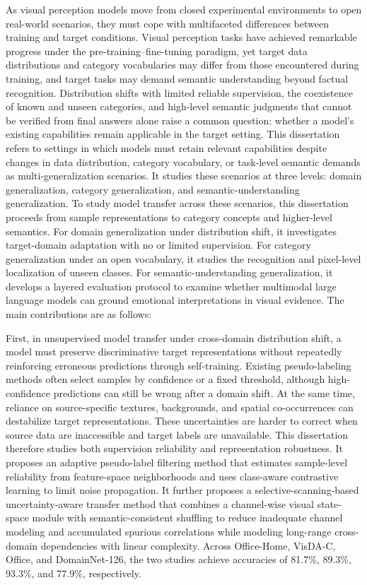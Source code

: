 \begin{eabstract}

As visual perception models move from closed experimental environments to open real-world scenarios, they must cope with multifaceted differences between training and target conditions. Visual perception tasks have achieved remarkable progress under the pre-training--fine-tuning paradigm, yet target data distributions and category vocabularies may differ from those encountered during training, and target tasks may demand semantic understanding beyond factual recognition. Distribution shifts with limited reliable supervision, the coexistence of known and unseen categories, and high-level semantic judgments that cannot be verified from final answers alone raise a common question: whether a model's existing capabilities remain applicable in the target setting. This dissertation refers to settings in which models must retain relevant capabilities despite changes in data distribution, category vocabulary, or task-level semantic demands as multi-generalization scenarios. It studies these scenarios at three levels: domain generalization, category generalization, and semantic-understanding generalization. To study model transfer across these scenarios, this dissertation proceeds from sample representations to category concepts and higher-level semantics. For domain generalization under distribution shift, it investigates target-domain adaptation with no or limited supervision. For category generalization under an open vocabulary, it studies the recognition and pixel-level localization of unseen classes. For semantic-understanding generalization, it develops a layered evaluation protocol to examine whether multimodal large language models can ground emotional interpretations in visual evidence. The main contributions are as follows:
  
First, in unsupervised model transfer under cross-domain distribution shift, a model must preserve discriminative target representations without repeatedly reinforcing erroneous predictions through self-training. Existing pseudo-labeling methods often select samples by confidence or a fixed threshold, although high-confidence predictions can still be wrong after a domain shift. At the same time, reliance on source-specific textures, backgrounds, and spatial co-occurrences can destabilize target representations. These uncertainties are harder to correct when source data are inaccessible and target labels are unavailable. This dissertation therefore studies both supervision reliability and representation robustness. It proposes an adaptive pseudo-label filtering method that estimates sample-level reliability from feature-space neighborhoods and uses class-aware contrastive learning to limit noise propagation. It further proposes a selective-scanning-based uncertainty-aware transfer method that combines a channel-wise visual state-space module with semantic-consistent shuffling to reduce inadequate channel modeling and accumulated spurious correlations while modeling long-range cross-domain dependencies with linear complexity. Across Office-Home, VisDA-C, Office, and DomainNet-126, the two studies achieve accuracies of 81.7\%, 89.3\%, 93.3\%, and 77.9\%, respectively.
  

\end{eabstract}
